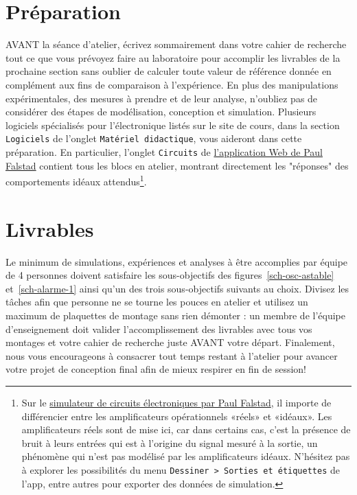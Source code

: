 \documentclass[canadien,12pt,oneside,letterpaper]{article}
\begin{document}
\section{Préparation}\label{sec:prep}
AVANT la séance d'atelier, écrivez sommairement dans votre cahier de recherche tout ce que vous prévoyez faire au laboratoire pour accomplir les livrables de la prochaine section sans oublier de calculer toute valeur de référence donnée en complément aux fins de comparaison à l'expérience. En plus des manipulations expérimentales, des mesures à prendre et de leur analyse, n'oubliez pas de considérer des étapes de modélisation, conception et simulation. Plusieurs logiciels spécialisés pour l'électronique listés sur le site de cours, dans la section \texttt{Logiciels} de l'onglet \texttt{Matériel didactique}, vous aideront dans cette préparation. En particulier, l'onglet \texttt{Circuits} de \href{https://www.falstad.com/circuit/}{l'application Web de Paul Falstad} contient tous les blocs en atelier, montrant directement les "réponses" des comportements idéaux attendus\footnote{Sur le \href{https://www.falstad.com/circuit/}{simulateur de circuits électroniques par Paul Falstad}, il importe de différencier entre les amplificateurs opérationnels «réels» et «idéaux». Les amplificateurs réels sont de mise ici, car dans certains cas, c'est la présence de bruit à leurs entrées qui est à l'origine du signal mesuré à la sortie, un phénomène qui n'est pas modélisé par les amplificateurs idéaux. N'hésitez pas à explorer les possibilités du menu \texttt{Dessiner~>~Sorties et étiquettes} de l'app, entre autres pour exporter des données de simulation.}. 

\vspace{10ex}
\section{Livrables}\label{sec:livrables}
Le minimum de simulations, expériences et analyses à être accomplies par équipe de 4 personnes doivent satisfaire les sous-objectifs des figures~\ref{sch-osc-astable} et~\ref{sch-alarme-1} ainsi qu'un des trois sous-objectifs suivants au choix. Divisez les tâches afin que personne ne se tourne les pouces en atelier et utilisez un maximum de plaquettes de montage sans rien démonter : un membre de l'équipe d'enseignement doit valider l'accomplissement des livrables avec tous vos montages et votre cahier de recherche juste AVANT votre départ. Finalement, nous vous encourageons à consacrer tout temps restant à l'atelier pour avancer votre projet de conception final afin de mieux respirer en fin de session!
\end{document}
